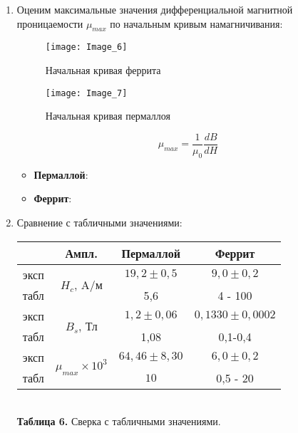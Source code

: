 \begin{enumerate}
\item Оценим максимальные значения дифференциальной магнитной проницаемости $\mu_{max}$ по начальным кривым намагничивания:

\begin{figure}[h!]
	\centering
	\texttt{[image: Image\_6]}
	\caption{Начальная кривая феррита}
\end{figure}

\newpage

\begin{figure}[h!]
	\centering
	\texttt{[image: Image\_7]}
	\caption{Начальная кривая пермаллоя}
\end{figure}
 \[
 \mu_{max} = \frac{1}{\mu_0} \frac{dB}{dH}
 \]
 
 \begin{itemize}
 	
 	\item	\textbf{Пермаллой}:
 	
 	
     \item	\textbf{Феррит}:
 	
 	
 \end{itemize}

\item Сравнение с табличными значениями:

\begin{center}
	\begin{tabular}{|c|c|c|c|}
		\hline
		& Ампл. & Пермаллой & Феррит \\ \hline
		эксп & \multirow{2}{*}{$H_c$, A/м} & $19,2 \pm 0,5$ & $9,0 \pm 0,2$ \\ \cline{1-1} \cline{3-4} 
		табл &  & 5,6  & 4 - 100 \\ \hline
		эксп & \multirow{2}{*}{$B_s$, Тл} & $1,2 \pm 0,06$  & $0,1330 \pm 0,0002$ \\ \cline{1-1} \cline{3-4} 
		табл &  & 1,08 &  0,1-0,4 \\ \hline
		эксп & \multirow{2}{*}{$\mu_{max} \times 10^3$} & $64,46 \pm 8,30$  & $6,0 \pm 0,2$ \\ \cline{1-1} \cline{3-4} 
		табл &  & $10 $ &  0,5 - 20 \\ \hline
	\end{tabular}\\
	\textbf{Таблица 6.} Сверка с табличными значениями.
\end{center}

\end{enumerate}

